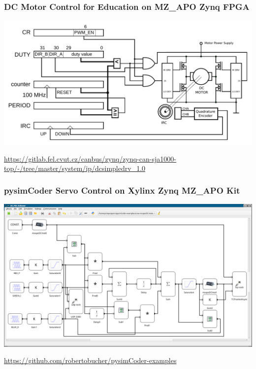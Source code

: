 \documentclass{beamer}
\begin{document}
\begin{frame}
\frametitle{DC Motor Control for Education on MZ\_APO Zynq FPGA}

\begin{center}
\includegraphics[width=1\textwidth,height=0.75\textheight,clip=true,keepaspectratio]{fig/mz_apo-dcspdrv-schema.pdf}
\par\end{center}

{\footnotesize \url{https://gitlab.fel.cvut.cz/canbus/zynq/zynq-can-sja1000-top/-/tree/master/system/ip/dcsimpledrv_1.0}}
\end{frame}


\begin{frame}
\frametitle{pysimCoder Servo Control on Xylinx Zynq MZ\_APO Kit}

\includegraphics[width=.95\linewidth,height=0.85\textheight,clip=true,keepaspectratio]{fig/DC_PID_follower-screenshot.png}

{\footnotesize \url{https://github.com/robertobucher/pysimCoder-examples}}

\end{frame}
\end{document}

